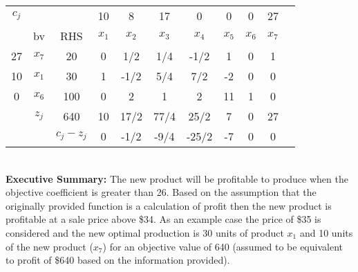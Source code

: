 \documentclass[answers]{exam}
\begin{document}
\begin{questions}
\begin{solution}
\begin{parts}
		\begin{tabular}{ccccccccccc}
			$c_j$                   &                            &                                & 10    & 8     & 17    & 0     & 0     & 0     & 27    &  \\
			\multicolumn{1}{c|}{}   & \multicolumn{1}{c|}{bv}    & \multicolumn{1}{c|}{RHS}       & $x_1$ & $x_2$ & $x_3$ & $x_4$ & $x_5$ & $x_6$ & $x_7$ &  \\ \cline{1-10}
			\multicolumn{1}{c|}{27} & \multicolumn{1}{c|}{$x_7$} & \multicolumn{1}{c|}{20}        & 0     & 1/2   & 1/4   & -1/2  & 1     & 0     & 1     &  \\
			\multicolumn{1}{c|}{10} & \multicolumn{1}{c|}{$x_1$} & \multicolumn{1}{c|}{30}        & 1     & -1/2  & 5/4   & 7/2   & -2    & 0     & 0     &  \\
			\multicolumn{1}{c|}{0}  & \multicolumn{1}{c|}{$x_6$} & \multicolumn{1}{c|}{100}       & 0     & 2     & 1     & 2     & 11    & 1     & 0     &  \\ \cline{1-10}
			& \multicolumn{1}{c|}{$z_j$} & \multicolumn{1}{c|}{640}       & 10    & 17/2  & 77/4  & 25/2  & 7     & 0     & 27    &  \\ \cline{3-10}
			&                            & \multicolumn{1}{c|}{$c_j-z_j$} & 0     & -1/2  & -9/4  & -25/2 & -7    & 0     & 0     & 
		\end{tabular} \\
	
		\textbf{Executive Summary:}
		The new product will be profitable to produce when the objective coefficient is greater than 26. Based on the assumption that the originally provided function is a calculation of profit then the new product is profitable at a sale price above \$34. As an example case the price of \$35 is considered and the new optimal production is 30 units of product $x_1$ and 10 units of the new product ($x_7$) for an objective value of 640 (assumed to be equivalent to profit of \$640 based on the information provided).
	
	\end{parts}
\end{solution}

\question
{}
\end{questions}
\end{document}
